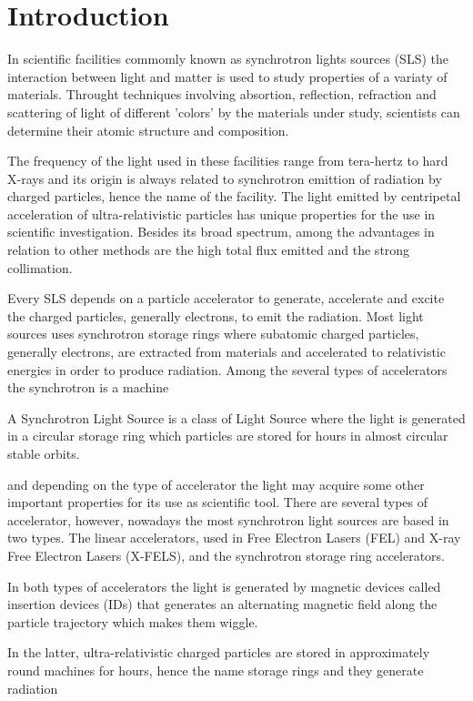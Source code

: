 \chapter{Introduction} 	\label{cap:intro}

In scientific facilities commomly known as synchrotron lights sources (SLS) the interaction between light and matter is used to study properties of a variaty of materials. Throught techniques involving absortion, reflection, refraction and scattering of light of different 'colors' by the materials under study, scientists can determine their atomic structure and composition.

The frequency of the light used in these facilities range from tera-hertz to hard X-rays and its origin is always related to synchrotron emittion of radiation by charged particles, hence the name of the facility. The light emitted by centripetal acceleration of ultra-relativistic particles has unique properties for the use in scientific investigation. Besides its broad spectrum, among the advantages in relation to other methods are the high total flux emitted and the strong collimation.


Every SLS depends on a particle accelerator to generate, accelerate and excite the charged particles, generally electrons, to emit the radiation. Most light sources uses synchrotron storage rings where subatomic charged particles, generally electrons, are extracted from materials and accelerated to relativistic energies in order to produce radiation. Among the several types of accelerators the synchrotron is a machine 

A Synchrotron Light Source is a class of Light Source where the light is generated in a circular storage ring which particles are stored for hours in almost circular stable orbits.


and depending on the type of accelerator the light may acquire some other important properties for its use as scientific tool. There are several types of accelerator, however, nowadays the most  synchrotron light sources are based in two types. The linear accelerators, used in Free Electron Lasers (FEL) and X-ray Free Electron Lasers (X-FELS), and the synchrotron storage ring accelerators.

In both types of accelerators the light is generated by magnetic devices called insertion devices (IDs) that generates an alternating magnetic field along the particle trajectory which makes them wiggle. 


In the latter, ultra-relativistic charged particles are stored in approximately round machines for hours, hence the name storage rings and they generate radiation 


